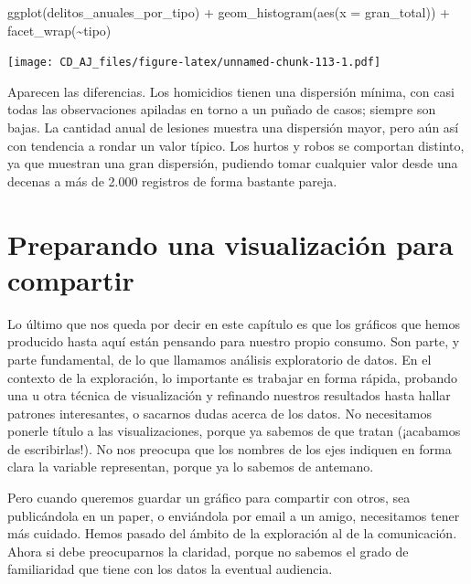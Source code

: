 \documentclass[
]{book}
\newenvironment{Shaded}{\begin{snugshade}}{\end{snugshade}}
\newcommand{\AttributeTok}[1]{\textcolor[rgb]{0.77,0.63,0.00}{#1}}
\newcommand{\FunctionTok}[1]{\textcolor[rgb]{0.00,0.00,0.00}{#1}}
\newcommand{\NormalTok}[1]{#1}
\newcommand{\SpecialCharTok}[1]{\textcolor[rgb]{0.00,0.00,0.00}{#1}}
\begin{document}
\begin{Shaded}
\begin{Highlighting}[]
\FunctionTok{ggplot}\NormalTok{(delitos\_anuales\_por\_tipo) }\SpecialCharTok{+} 
    \FunctionTok{geom\_histogram}\NormalTok{(}\FunctionTok{aes}\NormalTok{(}\AttributeTok{x =}\NormalTok{ gran\_total)) }\SpecialCharTok{+}
    \FunctionTok{facet\_wrap}\NormalTok{(}\SpecialCharTok{\textasciitilde{}}\NormalTok{tipo)}
\end{Highlighting}
\end{Shaded}

\texttt{[image: CD\_AJ\_files/figure-latex/unnamed-chunk-113-1.pdf]}

Aparecen las diferencias. Los homicidios tienen una dispersión mínima, con casi todas las observaciones apiladas en torno a un puñado de casos; siempre son bajas. La cantidad anual de lesiones muestra una dispersión mayor, pero aún así con tendencia a rondar un valor típico. Los hurtos y robos se comportan distinto, ya que muestran una gran dispersión, pudiendo tomar cualquier valor desde una decenas a más de 2.000 registros de forma bastante pareja.

\hypertarget{preparando-una-visualizaciuxf3n-para-compartir}{%
\section{Preparando una visualización para compartir}\label{preparando-una-visualizaciuxf3n-para-compartir}}

Lo último que nos queda por decir en este capítulo es que los gráficos que hemos producido hasta aquí están pensando para nuestro propio consumo. Son parte, y parte fundamental, de lo que llamamos análisis exploratorio de datos. En el contexto de la exploración, lo importante es trabajar en forma rápida, probando una u otra técnica de visualización y refinando nuestros resultados hasta hallar patrones interesantes, o sacarnos dudas acerca de los datos. No necesitamos ponerle título a las visualizaciones, porque ya sabemos de que tratan (¡acabamos de escribirlas!). No nos preocupa que los nombres de los ejes indiquen en forma clara la variable representan, porque ya lo sabemos de antemano.

Pero cuando queremos guardar un gráfico para compartir con otros, sea publicándola en un paper, o enviándola por email a un amigo, necesitamos tener más cuidado. Hemos pasado del ámbito de la exploración al de la comunicación. Ahora si debe preocuparnos la claridad, porque no sabemos el grado de familiaridad que tiene con los datos la eventual audiencia.
\end{document}
